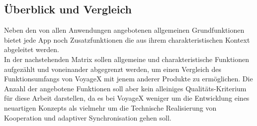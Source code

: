 \subsection{Überblick und Vergleich}\label{3_UEBER}
Neben den von allen Anwendungen angebotenen allgemeinen Grundfunktionen bietet jede App noch Zusatzfunktionen die aus ihrem charakteristischen Kontext abgeleitet werden.\\
In der nachstehenden Matrix sollen allgemeine und charakteristische Funktionen aufgezählt und voneinander abgegrenzt werden, um einen Vergleich des Funktionsumfangs von VoyageX mit jenem anderer Produkte zu ermöglichen. Die Anzahl der angebotene Funktionen soll aber kein alleiniges Qualitäts-Kriterium für diese Arbeit  darstellen, da es bei VoyageX weniger um die Entwicklung eines neuartigen Konzepts als vielmehr um die Technische Realisierung von Kooperation und adaptiver Synchronisation gehen soll.
